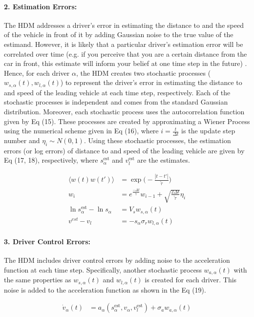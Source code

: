 \documentclass[12pt]{article}
\begin{document}
\paragraph{2. Estimation Errors:}
The HDM addresses a driver's error in estimating the distance to and the speed of the vehicle in front of it by adding Gaussian noise to the true value of the estimand.  However, it is likely that a particular driver's estimation error will be correlated over time (e.g. if you perceive that you are a certain distance from the car in front, this estimate will inform your belief at one time step in the future) \cite{human_driver_model}. Hence, for each driver $\alpha$, the HDM creates two stochastic processes ($w_{s,\alpha}(t),w_{l,\alpha}(t)$) to represent the driver's error in estimating the distance to and speed of the leading vehicle at each time step, respectively.  Each of the stochastic processes is independent and comes from the standard Gaussian distribution.  Moreover, each stochastic process uses the autocorrelation function given by Eq (15). These processes are created by approximating a Wiener Process using the numerical scheme given in Eq (16), where $i=\frac{t}{\Delta t}$ is the update step number and $\eta_i \sim N(0,1)$.  Using these stochastic processes, the estimation errors (or log errors) of distance to and speed of the leading vehicle are given by Eq (17, 18), respectively, where $s_\alpha^\text{est}$ and $v_l^\text{est}$ are the estimates.
\begin{mymathbox}[ams gather, title=Estimation Error Equations,colframe=blue!30!black]
  \begin{align}
  \langle w(t)w(t')\rangle&  =\exp\bigg(-\frac{|t-t'|}{\tilde{\tau}}\bigg)\\
  w_i&=e^{\frac{-\Delta t}{\tilde{\tau}}}w_{i-1}+\sqrt{\frac{2\Delta t}{\tilde\tau}}\eta_i\\
  \ln s_\alpha^{\text{est}} - \ln s_\alpha &= V_s w_{s,\alpha}(t)\\
  v^{est} - v_l &= -s_\alpha \sigma_r w_{l,\alpha}(t)
  \end{align}
\end{mymathbox}
\paragraph{3. Driver Control Errors:}
The HDM includes driver control errors by adding noise to the acceleration function at each time step.  Specifically, another stochastic process $w_{a,\alpha}(t)$ with the same properties as $w_{s,\alpha}(t)$ and  $w_{l,\alpha}(t)$ is created for each driver.  This noise is added to the acceleration function as shown in the Eq (19).
\begin{mymathbox}[ams gather, title=Driver Control Error Equation Equations,colframe=blue!30!black]
  \begin{align}
\dot v_\alpha(t)&=a_\alpha(s_\alpha^\text{est},v_\alpha,v_l^\text{est})+\sigma_a w_{a,\alpha}(t)
  \end{align}
\end{mymathbox}
\end{document}
